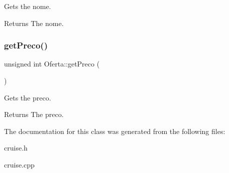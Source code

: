 Gets the nome. 

\begin{DoxyReturn}{Returns}
The nome. 
\end{DoxyReturn}
\mbox{\label{classOferta_a6237afc2e8a33fb55b1ef0decf9d9aaa}} 
\subsubsection{\texorpdfstring{get\+Preco()}{getPreco()}}
{\footnotesize\ttfamily unsigned int Oferta\+::get\+Preco (\begin{DoxyParamCaption}{ }\end{DoxyParamCaption})\hspace{0.3cm}{\ttfamily [inline]}}



Gets the preco. 

\begin{DoxyReturn}{Returns}
The preco. 
\end{DoxyReturn}


The documentation for this class was generated from the following files\+:\begin{DoxyCompactItemize}
\item 
cruise.\+h\item 
cruise.\+cpp\end{DoxyCompactItemize}
